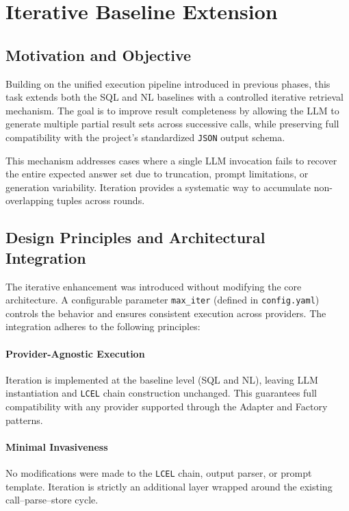 \section{Iterative Baseline Extension}

\subsection{Motivation and Objective}

Building on the unified execution pipeline introduced in previous phases, this task extends both the SQL and NL baselines with a controlled iterative retrieval mechanism. The goal is to improve result completeness by allowing the LLM to generate multiple partial result sets across successive calls, while preserving full compatibility with the project’s standardized \texttt{JSON} output schema.

This mechanism addresses cases where a single LLM invocation fails to recover the entire expected answer set due to truncation, prompt limitations, or generation variability. Iteration provides a systematic way to accumulate non-overlapping tuples across rounds.

\subsection{Design Principles and Architectural Integration}

The iterative enhancement was introduced without modifying the core architecture. A configurable parameter \texttt{max\_iter} (defined in \texttt{config.yaml}) controls the behavior and ensures consistent execution across providers. The integration adheres to the following principles:

\paragraph{Provider-Agnostic Execution}
Iteration is implemented at the baseline level (SQL and NL), leaving LLM instantiation and \texttt{LCEL} chain construction unchanged. This guarantees full compatibility with any provider supported through the Adapter and Factory patterns.

\paragraph{Minimal Invasiveness}
No modifications were made to the \texttt{LCEL} chain, output parser, or prompt template. Iteration is strictly an additional layer wrapped around the existing call--parse--store cycle.

